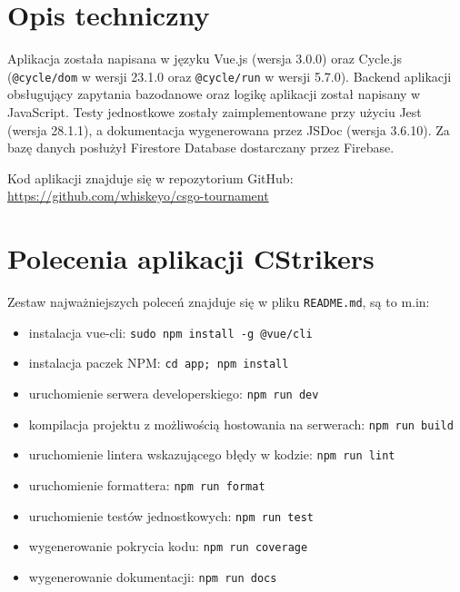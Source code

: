 \documentclass[shortabstract]{iithesis}
\theoremstyle{definition} \newtheorem{definition}{Definicja}[]
\theoremstyle{remark} \newtheorem{remark}[definition]{Observation}
\theoremstyle{plain} \newtheorem{theorem}[definition]{Theorem}
\theoremstyle{plain} \newtheorem{lemma}[definition]{Lemma}
\begin{document}
\chapter{Opis techniczny}
Aplikacja została napisana w języku Vue.js (wersja 3.0.0) oraz Cycle.js (\texttt{@cycle/dom} w wersji 23.1.0 oraz \texttt{@cycle/run} w wersji 5.7.0). Backend aplikacji obsługujący zapytania bazodanowe oraz logikę aplikacji został napisany w JavaScript. Testy jednostkowe zostały zaimplementowane przy użyciu Jest (wersja 28.1.1), a dokumentacja wygenerowana przez JSDoc (wersja 3.6.10). Za bazę danych posłużył Firestore Database dostarczany przez Firebase.

Kod aplikacji znajduje się w repozytorium GitHub:\newline
\url{https://github.com/whiskeyo/csgo-tournament}

\chapter{Polecenia aplikacji CStrikers}
Zestaw najważniejszych poleceń znajduje się w pliku \texttt{README.md}, są to m.in:
\begin{itemize}
    \item instalacja vue-cli: \texttt{sudo npm install -g @vue/cli}
    \item instalacja paczek NPM: \texttt{cd app; npm install}
    \item uruchomienie serwera developerskiego: \texttt{npm run dev}
    \item kompilacja projektu z możliwością hostowania na serwerach: \texttt{npm run build}
    \item uruchomienie lintera wskazującego błędy w kodzie: \texttt{npm run lint}
    \item uruchomienie formattera: \texttt{npm run format}
    \item uruchomienie testów jednostkowych: \texttt{npm run test}
    \item wygenerowanie pokrycia kodu: \texttt{npm run coverage}
    \item wygenerowanie dokumentacji: \texttt{npm run docs}
\end{itemize}


\end{document}

